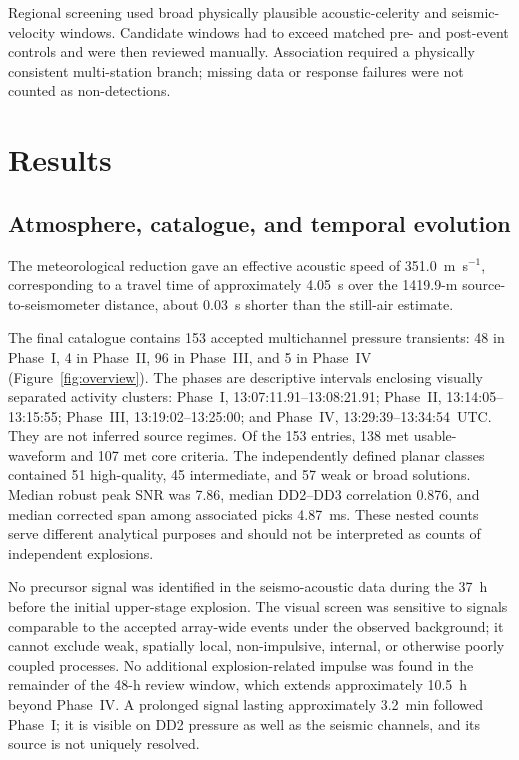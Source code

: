\documentclass[]{seismica}
\begin{document}
Regional screening used broad physically plausible acoustic-celerity and
seismic-velocity windows. Candidate windows had to exceed matched pre- and
post-event controls and were then reviewed manually. Association required a
physically consistent multi-station branch; missing data or response failures
were not counted as non-detections.

\section{Results}
\label{sec:results}

\subsection{Atmosphere, catalogue, and temporal evolution}
\label{sec:temporal_evolution}

The meteorological reduction gave an effective acoustic speed of
351.0~m~s$^{-1}$, corresponding to a travel time of approximately 4.05~s over
the 1419.9-m source-to-seismometer distance, about 0.03~s shorter than the
still-air estimate.

The final catalogue contains 153 accepted multichannel pressure transients:
48 in Phase~I, 4 in Phase~II, 96 in Phase~III, and 5 in Phase~IV
(Figure~\ref{fig:overview}). The phases are descriptive intervals enclosing
visually separated activity clusters: Phase~I, 13:07:11.91--13:08:21.91;
Phase~II, 13:14:05--13:15:55; Phase~III, 13:19:02--13:25:00; and Phase~IV,
13:29:39--13:34:54~UTC. They are not inferred source regimes. Of the 153
entries, 138 met usable-waveform and 107 met core
criteria. The independently defined planar classes contained 51 high-quality,
45 intermediate, and 57 weak or broad solutions. Median robust peak SNR was
7.86, median DD2--DD3 correlation 0.876, and median corrected span among
associated picks 4.87~ms. These nested counts serve different analytical
purposes and should not be interpreted as counts of independent explosions.

No precursor signal was identified in the seismo-acoustic data during the
37~h before the initial upper-stage explosion. The visual screen was sensitive
to signals comparable to the accepted array-wide events
under the observed background; it cannot exclude weak, spatially local,
non-impulsive, internal, or otherwise poorly coupled processes. No additional
explosion-related impulse was found in the remainder of the 48-h review window,
which extends approximately 10.5~h beyond Phase~IV. A prolonged signal lasting
approximately 3.2~min followed Phase~I; it is visible on DD2 pressure as well
as the seismic channels, and its source is not uniquely resolved.
\end{document}
